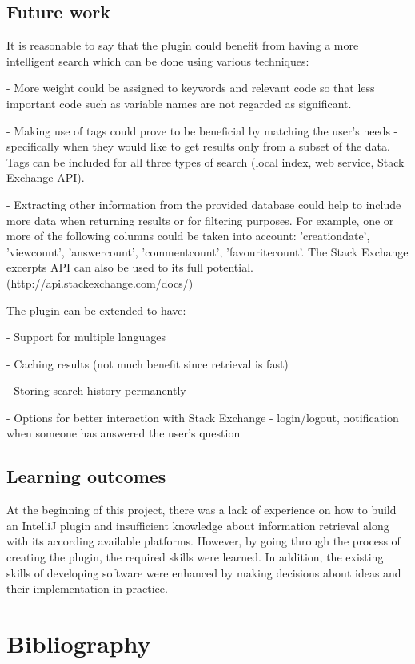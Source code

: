 \documentclass{l4proj}
\begin{document}
\section{Future work}
It is reasonable to say that the plugin could benefit from having a more intelligent search which can be done using various techniques:

- More weight could be assigned to keywords and relevant code so that less important code such as variable names are not regarded as significant. 

- Making use of tags could prove to be beneficial by matching the user's needs - specifically when they would like to get results only from a subset of the data. Tags can be included for all three types of search (local index, web service, Stack Exchange API).

- Extracting other information from the provided database could help to include more data when returning results or for filtering purposes. For example, one or more of the following columns could be taken into account: 'creationdate', 'viewcount', 'answercount', 'commentcount', 'favouritecount'. The Stack Exchange excerpts API can also be used to its full potential. (http://api.stackexchange.com/docs/)

The plugin can be extended to have:

- Support for multiple languages

- Caching results (not much benefit since retrieval is fast)

- Storing search history permanently

- Options for better interaction with Stack Exchange - login/logout, notification when someone has answered the user's question

\section{Learning outcomes}

At the beginning of this project, there was a lack of experience on how to build an IntelliJ plugin and insufficient knowledge about information retrieval along with its according available platforms. However, by going through the process of creating the plugin, the required skills were learned. In addition, the existing skills of developing software were enhanced by making decisions about ideas and their implementation in practice.

\chapter{Bibliography}
\end{document}
